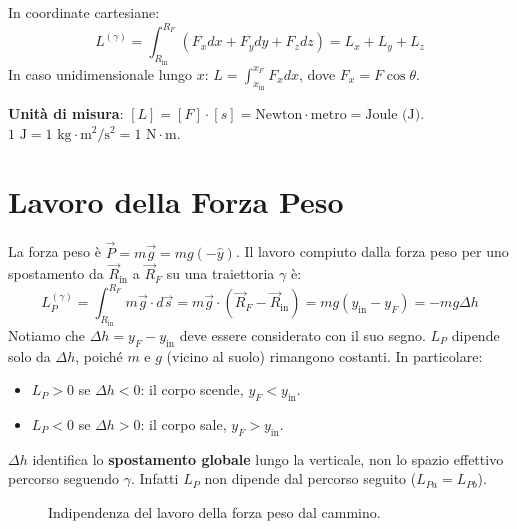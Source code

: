 In coordinate cartesiane:
\begin{equation}
    L^{(\gamma)} = \int_{R_{\text{in}}}^{R_F} (F_x dx + F_y dy + F_z dz) = L_x + L_y + L_z
\end{equation}
In caso unidimensionale lungo $x$: $L = \int_{x_{\text{in}}}^{x_F} F_x dx$, dove $F_x = F \cos\theta$.

\textbf{Unità di misura}: $[L] = [F] \cdot [s] = \text{Newton} \cdot \text{metro} = \text{Joule (J)}$.
$1\text{ J} = 1\text{ kg} \cdot \text{m}^2/\text{s}^2 = 1\text{ N} \cdot \text{m}$.

\section{Lavoro della Forza Peso}
La forza peso è $\vec{P} = m\vec{g} = mg(-\hat{y})$. Il lavoro compiuto dalla forza peso per uno spostamento da $\vec{R}_{\text{in}}$ a $\vec{R}_F$ su una traiettoria $\gamma$ è:
\begin{equation}
    L_P^{(\gamma)} = \int_{R_{\text{in}}}^{R_F} m\vec{g} \cdot d\vec{s} = m\vec{g} \cdot (\vec{R}_F - \vec{R}_{\text{in}}) = m g (y_{\text{in}} - y_F) = -mg\Delta h
\end{equation}
Notiamo che $\Delta h = y_F - y_{\text{in}}$ deve essere considerato con il suo segno. 
$L_P$ dipende solo da $\Delta h$, poiché $m$ e $g$ (vicino al suolo) rimangono costanti. In particolare:
\begin{itemize}
    \item $L_P > 0$ se $\Delta h < 0$: il corpo scende, $y_F < y_{\text{in}}$.
    \item $L_P < 0$ se $\Delta h > 0$: il corpo sale, $y_F > y_{\text{in}}$.
\end{itemize}
$\Delta h$ identifica lo \textbf{spostamento globale} lungo la verticale, non lo spazio effettivo percorso seguendo $\gamma$. Infatti $L_P$ non dipende dal percorso seguito ($L_{Pa} = L_{Pb}$).

\begin{figure}[ht]
    \centering
    \caption{Indipendenza del lavoro della forza peso dal cammino.}
\end{figure}


